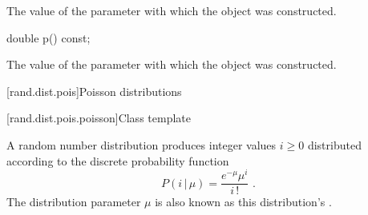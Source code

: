 \begin{itemdescr}
\pnum
\returns
The value of the  parameter
 with which the object was constructed.
\end{itemdescr}

\begin{indexed}{}
\begin{itemdecl}
double p() const;
\end{itemdecl}
\end{indexed}

\begin{itemdescr}
\pnum
\returns
The value of the  parameter
 with which the object was constructed.
\end{itemdescr}%
%
%



[rand.dist.pois]{Poisson distributions}%
%
%


[rand.dist.pois.poisson]{Class template }%
%
%

\pnum
A  random number distribution
produces integer values $i \geq 0$
distributed according to
the discrete probability function
%
%
\[ P(i\,|\,\mu) = \frac{e^{-\mu} \mu^{i}}{i\,!} \text{ .} \]
The distribution parameter $\mu$
is also known as this distribution's %
%
%
.

